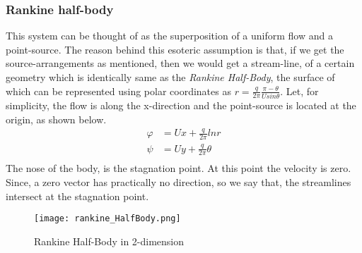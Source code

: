 \documentclass{book}
\begin{document}
\subsubsection{Rankine half-body}
This system can be thought of as the superposition of a uniform flow and a point-source. The reason behind this esoteric assumption is that, if we get the source-arrangements as mentioned, then we would get a stream-line, of a certain geometry which is identically same as the \emph{Rankine Half-Body}, the surface of which can be represented using polar coordinates as $r=\frac{q}{2\pi}\frac{\pi-\theta}{Usin\theta}$. Let, for simplicity, the flow is along the x-direction and the point-source is located at the origin, as shown below.
\begin{equation*}
\begin{split}
\varphi&=Ux+\frac{q}{2\pi}lnr\\
\psi&=Uy+\frac{q}{2\pi}\theta\\
\end{split}
\end{equation*}
The nose of the body, is the stagnation point. At this point the velocity is zero. Since, a zero vector has practically no direction, so we say that, the streamlines intersect at the stagnation point.
\begin{figure}[h]
\texttt{[image: rankine\_HalfBody.png]}
\caption{Rankine Half-Body in 2-dimension}
\end{figure}
\end{document}
